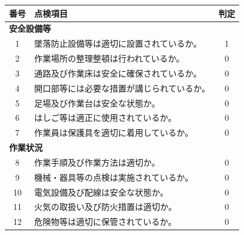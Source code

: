 \documentclass[UTF8,10pt,a4paper,fontset=fandol]{ctexart}
\newcommand{\fieldvalue}[1]{#1}
\newcommand{\handwritten}[1]{#1}
\begin{document}
\noindent
\begin{tabularx}{\textwidth}{|c|X|c|}
\hline
番号 & 点検項目 & 判定\\
\hline
\multicolumn{3}{|l|}{\textbf{安全設備等}}\\
\hline
1 & 墜落防止設備等は適切に設置されているか。 &
\fieldvalue{\handwritten{1}}\\
\hline
2 & 作業場所の整理整頓は行われているか。 &
\fieldvalue{\handwritten{0}}\\
\hline
3 & 通路及び作業床は安全に確保されているか。 &
\fieldvalue{\handwritten{0}}\\
\hline
4 & 開口部等には必要な措置が講じられているか。 &
\fieldvalue{\handwritten{0}}\\
\hline
5 & 足場及び作業台は安全な状態か。 &
\fieldvalue{\handwritten{0}}\\
\hline
6 & はしご等は適正に使用されているか。 &
\fieldvalue{\handwritten{0}}\\
\hline
7 & 作業員は保護具を適切に着用しているか。 &
\fieldvalue{\handwritten{0}}\\
\hline
\multicolumn{3}{|l|}{\textbf{作業状況}}\\
\hline
8 & 作業手順及び作業方法は適切か。 &
\fieldvalue{\handwritten{0}}\\
\hline
9 & 機械・器具等の点検は実施されているか。 &
\fieldvalue{\handwritten{0}}\\
\hline
10 & 電気設備及び配線は安全な状態か。 &
\fieldvalue{\handwritten{0}}\\
\hline
11 & 火気の取扱い及び防火措置は適切か。 &
\fieldvalue{\handwritten{0}}\\
\hline
12 & 危険物等は適切に保管されているか。 &
\fieldvalue{\handwritten{0}}\\

\end{tabularx}
\end{document}
